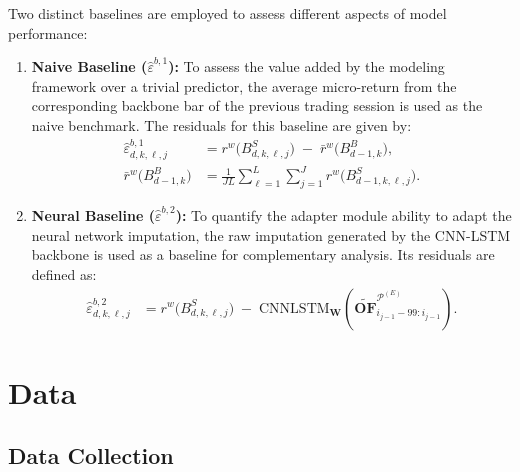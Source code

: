 \documentclass[10pt,a4paper,oneside]{article}
\begin{document}
Two distinct baselines are employed to assess different aspects of model performance:

\begin{enumerate}
    \item \textbf{Naive Baseline ($\hat{\varepsilon}^{b,1}$):} To assess the value added by the modeling framework over a trivial predictor, the average micro-return from the corresponding backbone bar of the previous trading session is used as the naive benchmark. The residuals for this baseline are given by:
          \begin{align*}
              \hat{\varepsilon}^{b, 1}_{d,k,\ell,j} & = r^w\bigl(B^S_{d,k,\ell,j}\bigr) \;-\; \bar{r}^w\bigl(B^B_{d - 1, k}\bigr),         \\
              \bar{r}^w\bigl(B^B_{d - 1, k}\bigr)   & = \frac{1}{JL} \sum_{\ell = 1}^L \sum_{j = 1}^J r^w\bigl(B^S_{d - 1,k,\ell,j}\bigr).
          \end{align*}

    \item \textbf{Neural Baseline ($\hat{\varepsilon}^{b,2}$):} To quantify the adapter module ability to adapt the neural network imputation, the raw imputation generated by the CNN-LSTM backbone is used as a baseline for complementary analysis. Its residuals are defined as:
          \begin{align*}
              \hat{\varepsilon}^{b, 2}_{d,k,\ell,j} & = r^w\bigl(B^S_{d,k,\ell,j}\bigr) \;-\; \mathrm{CNNLSTM}_{\mathbf{W}}\!\left(\widetilde{\mathbf{OF}}^{\mathcal{P}^{(E)}}_{i_{j-1}-99:i_{j-1}}\right).
          \end{align*}
\end{enumerate}


\section{Data}

\subsection{Data Collection}
\label{subsec:data_collection}


\end{document}
